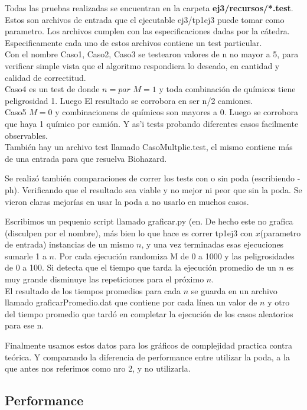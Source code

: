 \noindent 
Todas las pruebas realizadas se encuentran en la carpeta \textbf{ej3/recursos/*.test}.\\
Estos son archivos de entrada que el ejecutable ej3/tp1ej3 puede tomar como parametro. Los archivos cumplen con las especificaciones dadas por la c\'atedra. Especificamente cada uno de estos archivos contiene un test particular. \\
Con el nombre Caso1, Caso2, Caso3 se testearon valores de n no mayor a 5, para verificar simple vista que el algoritmo respondiera lo deseado, en cantidad y calidad de correctitud. \\
Caso4 es un test de donde $n=par$ $M=1$ y toda combinaci\'on de qu\'imicos tiene peligrosidad 1. Luego El resultado se corrobora en ser n/2 camiones. \\
Caso5 $M=0$ y combinacionens de qu\'imicos son mayores a 0. Luego se corrobora que haya 1 qu\'imico por cami\'on.
Y as'i tests probando diferentes casos facilmente observables. \\
Tambi\'en hay un archivo test llamado CasoMultplie.test, el mismo contiene m\'as de una entrada para que resuelva Biohazard. 

\noindent 
Se realiz\'o tambi\'en comparaciones de correr los tests con o sin poda (escribiendo -ph). Verificando que el resultado sea viable y no mejor ni peor que sin la poda. Se vieron claras mejor\'ias en usar la poda a no usarlo en muchos casos. 

\noindent 
Escribimos un pequenio script llamado graficar.py (en. De hecho este no grafica (disculpen por el nombre), m\'as bien lo que hace es correr tp1ej3 con $x$(parametro de entrada) instancias de un mismo $n$, y una vez terminadas esas ejecuciones sumarle 1 a $n$. Por cada ejecuci\'on randomiza M de 0 a 1000 y las peligrosidades de 0 a 100. Si detecta que el tiempo que tarda la ejecuci\'on promedio de un $n$ es muy grande disminuye las repeticiones para el pr\'oximo $n$. \\
El resultado de los tiempos promedios para cada $n$ se guarda en un archivo llamado graficarPromedio.dat que contiene por cada l\'inea un valor de $n$ y otro del tiempo promedio que tard\'o en completar la ejecuci\'on de los casos aleatorios para ese n.

\noindent 
Finalmente usamos estos datos para los gr\'aficos de complejidad practica contra te\'orica. Y comparando la diferencia de performance entre utilizar la poda, a la que antes nos referimos como nro 2, y no utilizarla.

\subsection{Performance}


